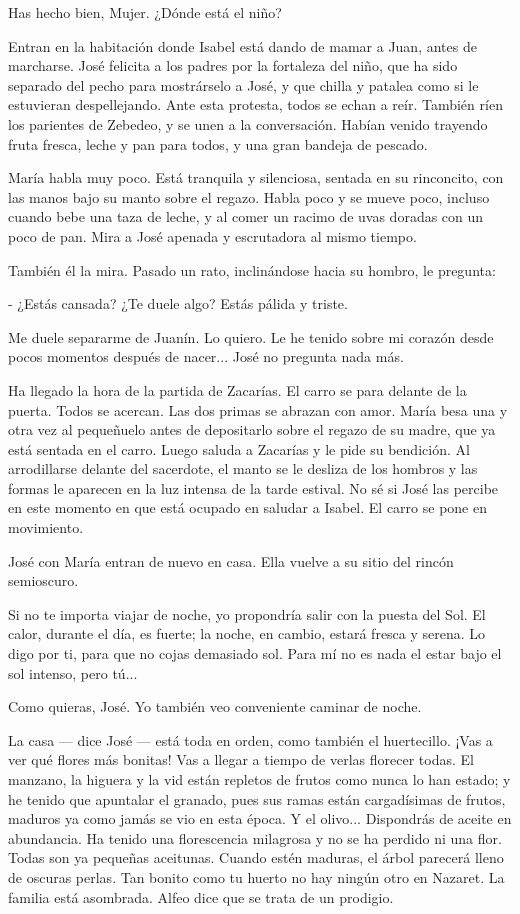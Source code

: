 \documentclass[12pt, twoside, openright]{book} %
\begin{document}
Has hecho bien, Mujer. ¿Dónde está el niño? 

Entran en la habitación donde Isabel está dando de mamar a Juan, antes de marcharse. José felicita a los padres por la fortaleza del niño, que ha sido separado del pecho para mostrárselo a José, y que chilla y patalea como si le estuvieran despellejando. Ante esta protesta, todos se echan a reír. También ríen los parientes de Zebedeo, y se unen a la conversación. Habían venido trayendo fruta fresca, leche y pan para todos, y una gran bandeja de pescado. 

María habla muy poco. Está tranquila y silenciosa, sentada en su rinconcito, con las manos bajo su manto sobre el regazo. Habla poco y se mueve poco, incluso cuando bebe una taza de leche, y al comer un racimo de uvas doradas con un poco de pan. Mira a José apenada y escrutadora al mismo tiempo. 

También él la mira. Pasado un rato, inclinándose hacia su hombro, le pregunta: 

- ¿Estás cansada? ¿Te duele algo? Estás pálida y triste. 

Me duele separarme de Juanín. Lo quiero. Le he tenido sobre mi corazón desde pocos momentos después de nacer... José no pregunta nada más. 

Ha llegado la hora de la partida de Zacarías. El carro se para delante de la puerta. Todos se acercan. Las dos primas se abrazan con amor. María besa una y otra vez al pequeñuelo antes de depositarlo sobre el regazo de su madre, que ya está sentada en el carro. Luego saluda a Zacarías y le pide su bendición. Al arrodillarse delante del sacerdote, el manto se le desliza de los hombros y las formas le aparecen en la luz intensa de la tarde estival. No sé si José las percibe en este momento en que está ocupado en saludar a Isabel. El carro se pone en movimiento. 

José con María entran de nuevo en casa. Ella vuelve a su sitio del rincón semioscuro. 

Si no te importa viajar de noche, yo propondría salir con la puesta del Sol. El calor, durante el día, es fuerte; la noche, en cambio, estará fresca y serena. Lo digo por ti, para que no cojas demasiado sol. Para mí no es nada el estar bajo el sol intenso, pero tú... 

Como quieras, José. Yo también veo conveniente caminar de noche. 

La casa — dice José — está toda en orden, como también el huertecillo. ¡Vas a ver qué flores más bonitas! Vas a llegar a tiempo de verlas florecer todas. El manzano, la higuera y la vid están repletos de frutos como nunca lo han estado; y he tenido que apuntalar el granado, pues sus ramas están cargadísimas de frutos, maduros ya como jamás se vio en esta época. Y el olivo... Dispondrás de aceite en abundancia. Ha tenido una florescencia milagrosa y no se ha perdido ni una flor. Todas son ya pequeñas aceitunas. Cuando estén maduras, el árbol parecerá lleno de oscuras perlas. Tan bonito como tu huerto no hay ningún otro en Nazaret. La familia está asombrada. Alfeo dice que se trata de un prodigio. 
\end{document}
